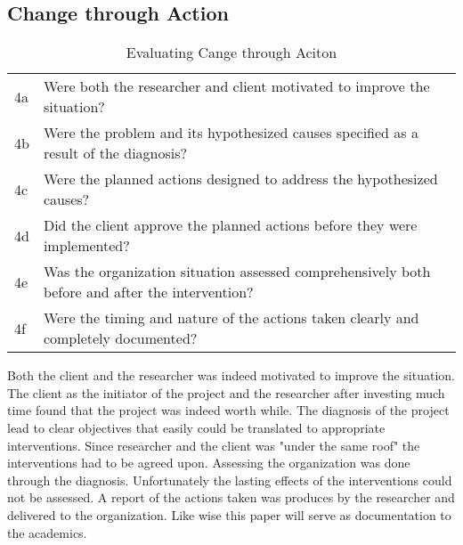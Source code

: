 \subsection{Change through Action}
\begin{table}[h]
\centering
\begin{tabular}{p{2cm} p{8cm}}
\hline
4a & Were both the researcher and client motivated to improve the situation? \\
4b & Were the problem and its hypothesized causes specified as a result of the diagnosis? \\
4c & Were the planned actions designed to address the hypothesized causes? \\
4d & Did the client approve the planned actions before they were implemented? \\
4e & Was the organization situation assessed comprehensively both before and after the intervention? \\
4f & Were the timing and nature of the actions taken clearly and completely documented? \\
\hline
\end{tabular}
\caption{Evaluating Cange through Aciton}
\label{tab:evachange}
\end{table}
Both the client and the researcher was indeed motivated to improve the situation.
The client as the initiator of the project and the researcher after investing much time found that the project was indeed worth while.
The diagnosis of the project lead to clear objectives that easily could be translated to appropriate interventions.
Since researcher and the client was "under the same roof" the interventions had to be agreed upon. 
Assessing the organization was done through the diagnosis. Unfortunately the lasting effects of the interventions could not be assessed. 
A report of the actions taken was produces by the researcher and delivered to the organization. 
Like wise this paper will serve as documentation to the academics. 

\newpage
